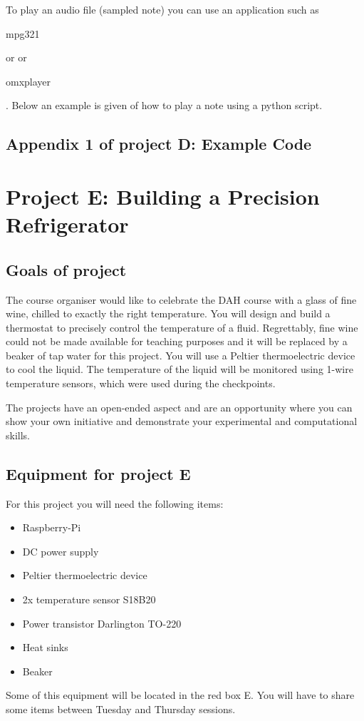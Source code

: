 To play an audio file (sampled note) you can use an application such as \begin{tt}mpg321\end{tt} or or  \begin{tt}omxplayer\end{tt}. Below an example is given of how to play a note using a python script.\\


\vspace*{-0.5cm}




\subsection*{Appendix 1 of project D: Example Code}




\newpage
\section{Project E: Building a Precision Refrigerator}

\subsection{Goals of project}

The course organiser would like to celebrate the DAH course with a glass of fine wine, chilled to exactly the right temperature.
You will design and build a thermostat to precisely control the temperature of a fluid.
Regrettably, fine wine could not be made available for teaching purposes and it will be replaced by a beaker of tap water for this project.
You will use a Peltier thermoelectric device to cool the liquid.
The temperature of the liquid will be monitored using 1-wire temperature sensors, which were used during the checkpoints.

The projects have an open-ended aspect and are an opportunity where you can show your own initiative and demonstrate your experimental and computational skills. 

\subsection{Equipment for project E}

For this project you will need the following items:
\begin{itemize}
\item Raspberry-Pi
\item DC power supply
\item Peltier thermoelectric device
\item 2x temperature sensor S18B20
\item Power transistor Darlington TO-220
\item Heat sinks
\item Beaker
\end{itemize}
Some of this equipment will be located in the red box E. You will have to share some items between Tuesday and Thursday sessions. 


